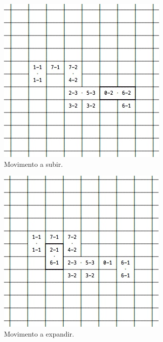 \documentclass[a4paper]{article}
\begin{document}
\begin{figure}[h!]
\begin{center}
\includegraphics[scale=0.6]{inter_climb.jpg}
\caption{Movimento a subir.}
\label{inter_climb}
\end{center}
\end{figure}

\begin{figure}[h!]
\begin{center}
\includegraphics[scale=0.6]{inter_expand.jpg}
\caption{Movimento a expandir.}
\label{inter_expand}
\end{center}
\end{figure}

\end{document}
